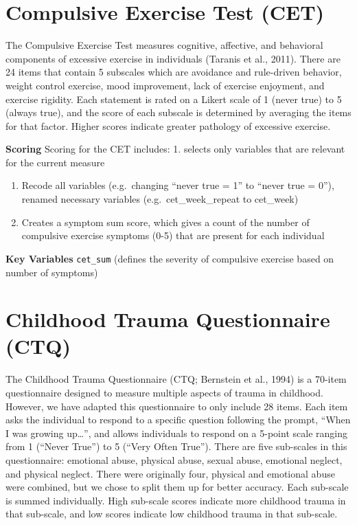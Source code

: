 \documentclass[
]{book}
\begin{document}
\section{Compulsive Exercise Test (CET)}\label{compulsive-exercise-test-cet}

The Compulsive Exercise Test measures cognitive, affective, and
behavioral components of excessive exercise in individuals (Taranis et
al., 2011). There are 24 items that contain 5 subscales which are
avoidance and rule-driven behavior, weight control exercise, mood
improvement, lack of exercise enjoyment, and exercise rigidity. Each
statement is rated on a Likert scale of 1 (never true) to 5 (always
true), and the score of each subscale is determined by averaging the
items for that factor. Higher scores indicate greater pathology of
excessive exercise.

\textbf{Scoring} Scoring for the CET includes: 1. selects only variables that
are relevant for the current measure

\begin{enumerate}
\def\labelenumi{\arabic{enumi}.}
\setcounter{enumi}{1}
\item
  Recode all variables (e.g.~changing ``never true = 1'' to ``never true
  = 0''), renamed necessary variables (e.g.~cet\_week\_repeat to
  cet\_week)
\item
  Creates a symptom sum score, which gives a count of the number of
  compulsive exercise symptoms (0-5) that are present for each
  individual
\end{enumerate}

\textbf{Key Variables} \texttt{cet\_sum} (defines the severity of compulsive exercise
based on number of symptoms)

\section{Childhood Trauma Questionnaire (CTQ)}\label{childhood-trauma-questionnaire-ctq}

The Childhood Trauma Questionnaire (CTQ; Bernstein et al., 1994) is a
70-item questionnaire designed to measure multiple aspects of trauma in
childhood. However, we have adapted this questionnaire to only include
28 items. Each item asks the individual to respond to a specific
question following the prompt, ``When I was growing up\ldots{}'', and allows
individuals to respond on a 5-point scale ranging from 1 (``Never True'')
to 5 (``Very Often True''). There are five sub-scales in this
questionnaire: emotional abuse, physical abuse, sexual abuse, emotional
neglect, and physical neglect. There were originally four, physical and
emotional abuse were combined, but we chose to split them up for better
accuracy. Each sub-scale is summed individually. High sub-scale scores
indicate more childhood trauma in that sub-scale, and low scores
indicate low childhood trauma in that sub-scale.
\end{document}
